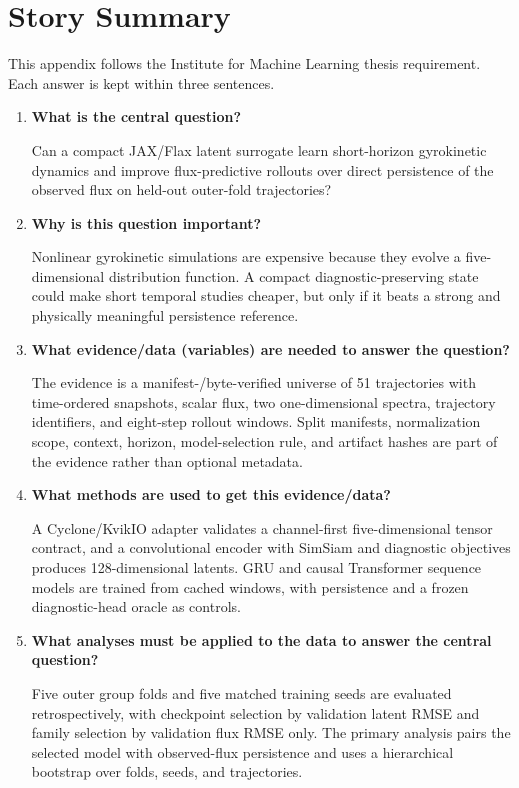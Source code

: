 \cleardoubleoddpage
\chapter{Story Summary}
\label{app:story-summary}

This appendix follows the Institute for Machine Learning thesis requirement. Each answer is kept
within three sentences.

\begin{enumerate}
  \item \textbf{What is the central question?}

  Can a compact JAX/Flax latent surrogate learn short-horizon gyrokinetic dynamics and improve
  flux-predictive rollouts over direct persistence of the observed flux on held-out outer-fold
  trajectories?

  \item \textbf{Why is this question important?}

  Nonlinear gyrokinetic simulations are expensive because they evolve a five-dimensional
  distribution function. A compact diagnostic-preserving state could make short temporal studies
  cheaper, but only if it beats a strong and physically meaningful persistence reference.

  \item \textbf{What evidence/data (variables) are needed to answer the question?}

  The evidence is a manifest-/byte-verified universe of 51 trajectories with time-ordered snapshots,
  scalar flux, two one-dimensional spectra, trajectory identifiers, and eight-step rollout windows.
  Split manifests, normalization scope, context, horizon, model-selection rule, and artifact hashes
  are part of the evidence rather than optional metadata.

  \item \textbf{What methods are used to get this evidence/data?}

  A Cyclone/KvikIO adapter validates a channel-first five-dimensional tensor contract, and a
  convolutional encoder with SimSiam and diagnostic objectives produces 128-dimensional latents.
  GRU and causal Transformer sequence models are trained from cached windows, with persistence and
  a frozen diagnostic-head oracle as controls.

  \item \textbf{What analyses must be applied to the data to answer the central question?}

  Five outer group folds and five matched training seeds are evaluated retrospectively, with
  checkpoint selection by validation latent RMSE and family selection by validation flux RMSE only.
  The primary analysis pairs the selected model with observed-flux persistence and uses a
  hierarchical bootstrap over folds, seeds, and trajectories.


\end{enumerate}
